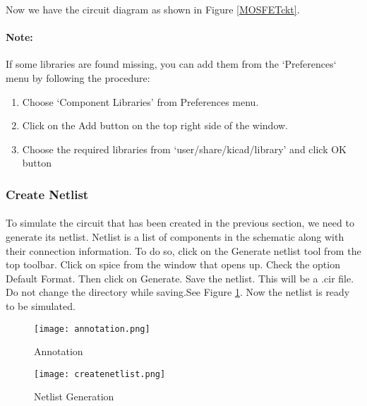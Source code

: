 Now we have the circuit diagram as shown in Figure \ref{MOSFETckt}.


\paragraph{Note:} If some libraries are found missing, you can add them from the `Preferences` menu by following the procedure: 

\begin{enumerate}
\item
Choose `Component Libraries' from Preferences menu.

\item
Click on the Add button on the top right side of the window.

\item
Choose the required libraries from `user/share/kicad/library' and click OK button

\end{enumerate}

\subsubsection{Create Netlist}

\paragraph{}To simulate the circuit that has been created in the previous section, we need to generate
its netlist. Netlist is a list of components in the schematic along with their connection
information. To do so, click on the Generate netlist tool from the top toolbar. Click on
spice from the window that opens up. Check the option Default Format. Then click
on Generate. Save the netlist. This will be a .cir file. Do
not change the directory while saving.See Figure \ref{createnetlist8}.
 Now the netlist is ready to be simulated. 
\begin{figure}
\begin{minipage}{.5\textwidth}
  \centering
  \texttt{[image: annotation.png]}
  \caption{Annotation}
  \label{annotation8}
\end{minipage}%
\begin{minipage}{.5\textwidth}
  \centering
  \texttt{[image: createnetlist.png]}
  \caption{Netlist Generation}
  \label{createnetlist8}
\end{minipage}
\end{figure}

